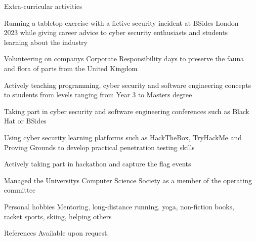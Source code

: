 \documentclass{resume} %
\begin{document}
\begin{rSection}{Extra-curricular activities}
\item Running a tabletop exercise with a fictive security incident at BSides London 2023 while giving career advice to cyber security enthusiasts and students learning about the industry
\item Volunteering on company\textsc{}s Corporate Responsibility days to preserve the fauna and flora of parts from the United Kingdom 
\item Actively teaching programming, cyber security and software engineering concepts to students from levels ranging from Year 3 to Masters degree 
\item Taking part in cyber security and software engineering conferences such as Black Hat or BSides
\item Using cyber security learning platforms such as HackTheBox, TryHackMe and Proving Grounds to develop practical penetration testing skills
\item Actively taking part in hackathon and capture the flag events
\item Managed the University\textsc{}s Computer Science Society as a member of the operating committee\\

\end{rSection}

\begin{rSection}{Personal hobbies}
Mentoring, long-distance running, yoga, non-fiction books, racket sports, skiing, helping others\\
\end{rSection}

\begin{rSection}{References}
Available upon request.
\end{rSection}
\end{document}
